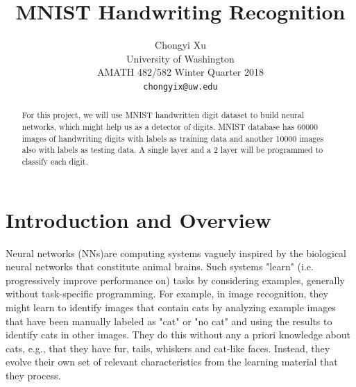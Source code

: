 \documentclass[preprint,12pt]{elsarticle}
\begin{document}
    \begin{frontmatter}
    \title{\LARGE \bf
        MNIST Handwriting Recognition
        }
        
        \author{ \parbox{3 in}{\centering Chongyi Xu \\
                 University of Washington\\
                 AMATH 482/582 Winter Quarter 2018\\
                 {\tt\small chongyix@uw.edu}}
        }

    
    \begin{abstract}
        For this project, we will use MNIST handwritten digit dataset to build neural networks, which might
        help us as a detector of digits. MNIST database has 60000 images of handwriting digits with labels 
        as training data and another 10000 images also with labels as testing data. A single layer and a 
        2 layer will be programmed to classify each digit.
    \end{abstract}
    \end{frontmatter}
    
    \section{Introduction and Overview}
        Neural networks (NNs)are computing systems vaguely inspired by the biological neural networks 
        that constitute animal brains. Such systems "learn" (i.e. progressively improve performance on) 
        tasks by considering examples, generally without task-specific programming. For example, in 
        image recognition, they might learn to identify images that contain cats by analyzing example
        images that have been manually labeled as "cat" or "no cat" and using the results to identify 
        cats in other images. They do this without any a priori knowledge about cats, e.g., that they
        have fur, tails, whiskers and cat-like faces. Instead, they evolve their own set of relevant
        characteristics from the learning material that they process.
    
    
\end{document}
